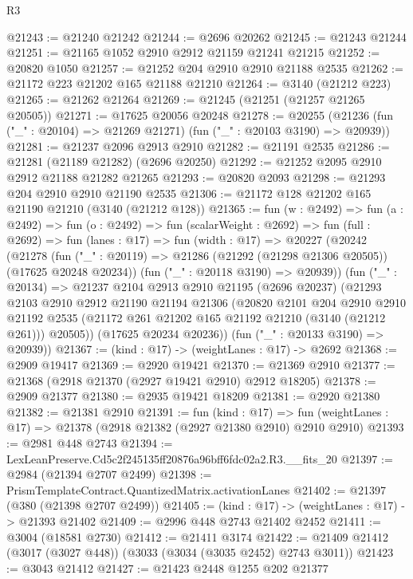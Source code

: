 \begin{lexlean}{R3}
\begin{coremodule}
@21243 := @21240 @21242
@21244 := @2696 @20262
@21245 := @21243 @21244
@21251 := @21165 @1052 @2910 @2912 @21159 @21241 @21215
@21252 := @20820 @1050
@21257 := @21252 @204 @2910 @2910 @21188 @2535
@21262 := @21172 @223 @21202 @165 @21188 @21210
@21264 := @3140 (@21212 @223)
@21265 := @21262 @21264
@21269 := @21245 (@21251 (@21257 @21265 @20505))
@21271 := @17625 @20056 @20248
@21278 := @20255 (@21236 (fun ("_" : @20104) => @21269 @21271) (fun ("_" : @20103 @3190) => @20939))
@21281 := @21237 @2096 @2913 @2910
@21282 := @21191 @2535
@21286 := @21281 (@21189 @21282) (@2696 @20250)
@21292 := @21252 @2095 @2910 @2912 @21188 @21282 @21265
@21293 := @20820 @2093
@21298 := @21293 @204 @2910 @2910 @21190 @2535
@21306 := @21172 @128 @21202 @165 @21190 @21210 (@3140 (@21212 @128))
@21365 := fun (w : @2492) =>
  fun (a : @2492) =>
  fun (o : @2492) =>
  fun (scalarWeight : @2692) =>
  fun (full : @2692) =>
  fun (lanes : @17) =>
  fun (width : @17) =>
  @20227
    (@20242
      (@21278
        (fun ("_" : @20119) => @21286 (@21292 (@21298 @21306 @20505)) (@17625 @20248 @20234))
        (fun ("_" : @20118 @3190) => @20939))
      (fun ("_" : @20134) =>
      @21237
        @2104
        @2913
        @2910
        @21195
        (@2696 @20237)
        (@21293
          @2103
          @2910
          @2912
          @21190
          @21194
          @21306
          (@20820
            @2101
            @204
            @2910
            @2910
            @21192
            @2535
            (@21172 @261 @21202 @165 @21192 @21210 (@3140 (@21212 @261)))
            @20505))
        (@17625 @20234 @20236))
      (fun ("_" : @20133 @3190) => @20939))
@21367 := (kind : @17) -> (weightLanes : @17) -> @2692
@21368 := @2909 @19417
@21369 := @2920 @19421
@21370 := @21369 @2910
@21377 := @21368 (@2918 @21370 (@2927 @19421 @2910) @2912 @18205)
@21378 := @2909 @21377
@21380 := @2935 @19421 @18209
@21381 := @2920 @21380
@21382 := @21381 @2910
@21391 := fun (kind : @17) =>
  fun (weightLanes : @17) => @21378 (@2918 @21382 (@2927 @21380 @2910) @2910 @2910)
@21393 := @2981 @448 @2743
@21394 := LexLeanPreserve.Cd5c2f245135ff20876a96bff6fdc02a2.R3.__fits_20
@21397 := @2984 (@21394 @2707 @2499)
@21398 := PrismTemplateContract.QuantizedMatrix.activationLanes
@21402 := @21397 (@380 (@21398 @2707 @2499))
@21405 := (kind : @17) -> (weightLanes : @17) -> @21393 @21402
@21409 := @2996 @448 @2743 @21402 @2452
@21411 := @3004 (@18581 @2730)
@21412 := @21411 @3174
@21422 := @21409 @21412 (@3017 (@3027 @448)) (@3033 (@3034 (@3035 @2452) @2743 @3011))
@21423 := @3043 @21412
@21427 := @21423 @2448 @1255 @202 @21377

\end{coremodule}
\end{lexlean}
